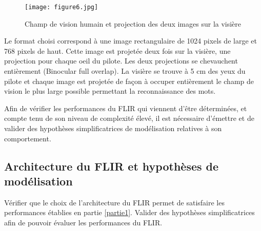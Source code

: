 
\begin{figure}[!htb]
\begin{center}
\texttt{[image: figure6.jpg]}
\caption{Champ de vision humain et projection des deux images sur la visière \label{figure6}}
\end{center}
\end{figure}

Le format choisi correspond à une image rectangulaire de 1024 pixels de large et 768 pixels de haut. Cette image
est projetée deux fois sur la visière, une projection pour chaque oeil du pilote. Les deux projections se chevauchent
entièrement (Binocular full overlap). La visière se trouve à 5 cm des yeux du pilote et chaque image est projetée
de façon à occuper entièrement le champ de vision le plus large possible permettant la reconnaissance des mots.




Afin de vérifier les performances du FLIR qui viennent d'être déterminées, et compte tenu de son niveau de
complexité élevé, il est nécessaire d'émettre et de valider des hypothèses simplificatrices de modélisation relatives
à son comportement.

\subsection{Architecture du FLIR et hypothèses de modélisation}\label{partie2}

\begin{obj}
Vérifier que le choix de l'architecture du FLIR permet de satisfaire les performances établies en partie \ref{partie1}.
Valider des hypothèses simplificatrices afin de pouvoir évaluer les performances du FLIR.
\end{obj}

